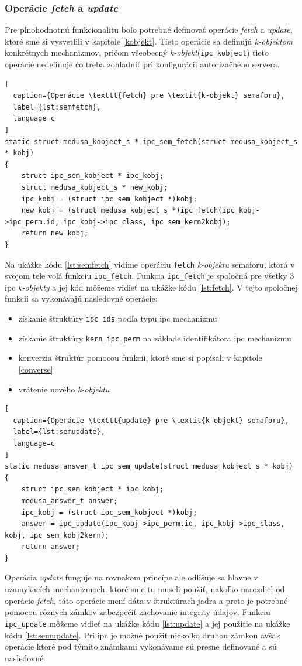 \subsubsection{Operácie \textit{fetch} a \textit{update}} \label{ops}
Pre plnohodnotnú funkcionalitu bolo potrebné definovať operácie \textit{fetch} a \textit{update}, ktoré sme si vysvetlili v kapitole \ref{kobjekt}. Tieto operácie sa definujú \textit{k-objektom} konkrétnych mechanizmov, pričom všeobecný \textit{k-objekt}(\texttt{ipc\_kobject}) tieto operácie nedefinuje čo treba zohľadniť pri konfigurácii autorizačného servera. 
\begin{lstlisting}[
  caption={Operácie \texttt{fetch} pre \textit{k-objekt} semaforu},
  label={lst:semfetch},
  language=c
]
static struct medusa_kobject_s * ipc_sem_fetch(struct medusa_kobject_s * kobj)
{
	struct ipc_sem_kobject * ipc_kobj;
	struct medusa_kobject_s * new_kobj;
	ipc_kobj = (struct ipc_sem_kobject *)kobj;
	new_kobj = (struct medusa_kobject_s *)ipc_fetch(ipc_kobj->ipc_perm.id, ipc_kobj->ipc_class, ipc_sem_kern2kobj);
	return new_kobj;
}
\end{lstlisting}
Na ukážke kódu \ref{lst:semfetch} vidíme operáciu \texttt{fetch} \textit{k-objektu} semaforu, ktorá v svojom tele volá funkciu \texttt{ipc\_fetch}. Funkcia \texttt{ipc\_fetch} je spoločná pre všetky 3 \acrshort{ipc} \textit{k-objekty} a jej kód môžeme vidieť na ukážke kódu \ref{lst:fetch}. V tejto spoločnej funkcii sa vykonávajú nasledovné operácie:
\begin{itemize}
\item získanie štruktúry \texttt{ipc\_ids} podľa typu \acrshort{ipc} mechanizmu
\item získanie štruktúry \texttt{kern\_ipc\_perm} na základe identifikátora \acrshort{ipc} mechanizmu
\item konverzia štruktúr pomocou funkcii, ktoré sme si popísali v kapitole \ref{converse}
\item vrátenie nového \textit{k-objektu}
\end{itemize}
\begin{lstlisting}[
  caption={Operácie \texttt{update} pre \textit{k-objekt} semaforu},
  label={lst:semupdate},
  language=c
]
static medusa_answer_t ipc_sem_update(struct medusa_kobject_s * kobj)
{
	struct ipc_sem_kobject * ipc_kobj;
	medusa_answer_t answer;
	ipc_kobj = (struct ipc_sem_kobject *)kobj;
	answer = ipc_update(ipc_kobj->ipc_perm.id, ipc_kobj->ipc_class, kobj, ipc_sem_kobj2kern);
	return answer;
}
\end{lstlisting}
Operácia \textit{update} funguje na rovnakom princípe ale odlišuje sa hlavne v uzamykacích mechanizmoch, ktoré sme tu museli použiť, nakoľko narozdiel od operácie \textit{fetch}, táto operácie mení dáta v štruktúrach jadra a preto je potrebné pomocou rôznych zámkov zabezpečiť zachovanie integrity údajov. Funkciu \texttt{ipc\_update} môžeme vidieť na ukážke kódu \ref{lst:update} a jej použitie na ukážke kódu \ref{lst:semupdate}. Pri \acrshort{ipc} je možné použiť niekoľko druhou zámkou avšak operácie ktoré pod týmito známkami vykonávame sú presne definované a sú nasledovné
